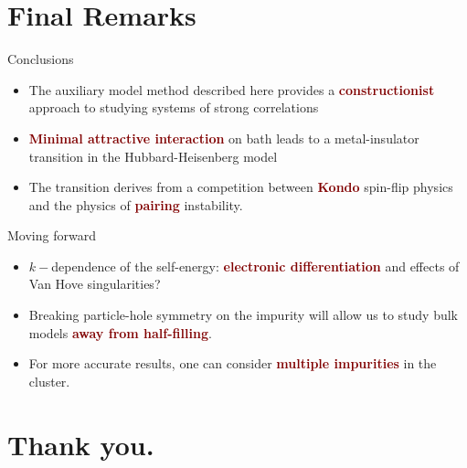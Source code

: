 \documentclass[aspectratio=169]{beamer}
\newcommand{\focus}[1]{\textcolor{maroon}{\textbf{#1}}}
\begin{document}
\section{Final Remarks}
\label{concl}

\begin{frame}[noframenumbering]{Conclusions}
	\begin{itemize}[<+->]
		\item The auxiliary model method described here provides a \focus{constructionist} approach to studying systems of strong correlations
		\item \focus{Minimal attractive interaction} on bath leads to a metal-insulator transition in the Hubbard-Heisenberg model
		\item The transition derives from a competition between \focus{Kondo} spin-flip physics and the physics of \focus{pairing} instability.
\end{itemize}
\end{frame}

\begin{frame}[noframenumbering]{Moving forward}
\begin{itemize}[<+->]
	\item \(k-\)dependence of the self-energy: \focus{electronic differentiation} and effects of Van Hove singularities?
	\item Breaking particle-hole symmetry on the impurity will allow us to study bulk models \focus{away from half-filling}.
	\item For more accurate results, one can consider \focus{multiple impurities} in the cluster.
\end{itemize}
\end{frame}

\section{Thank you.}
\end{document}
